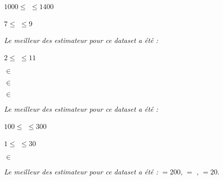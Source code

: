             \begin{bluebox}[XGBoost]
                \begin{diamond-enum}
                    \item $1000 \leqslant$  $\leqslant 1400$
                    \item $7 \leqslant$  $\leqslant 9$
                \end{diamond-enum}
                \nextenv
                \emph{Le meilleur des estimateur pour ce dataset a été :} 
            \end{bluebox}

            \begin{bluebox}[KNN]
                \begin{diamond-enum}
                    \item $2 \leqslant$  $\leqslant 11$
                    \item {} $\in$ 
                    \item {} $\in$ \ilc{[1, 2]}
                    \item {} $\in$ 
                \end{diamond-enum}
                \nextenv
                \emph{Le meilleur des estimateur pour ce dataset a été :}
            \end{bluebox}

            \begin{bluebox}[RandomForest]
                \begin{diamond-enum}
                    \item $100 \leqslant$  $\leqslant 300$
                    \item $1 \leqslant$  $\leqslant 30$
                    \item {} $\in$ 
                \end{diamond-enum}
                \nextenv
                \emph{Le meilleur des estimateur pour ce dataset a été :}  $= 200$,  $=$ ,  $= 20$.
            \end{bluebox}

